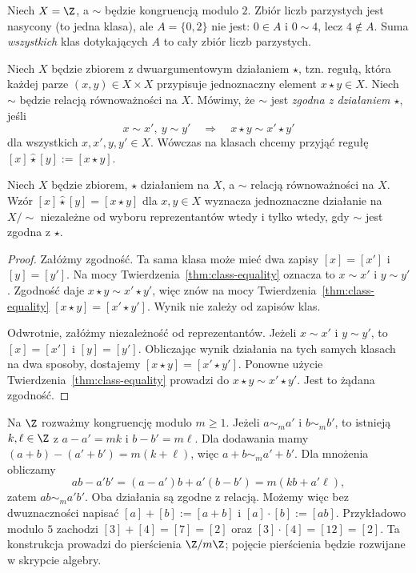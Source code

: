 \begin{przyklad}
Niech $X=\Z$, a $\sim$ będzie kongruencją modulo $2$.
Zbiór liczb parzystych jest nasycony (to jedna klasa),
ale $A=\{0,2\}$ nie jest: $0\in A$ i $0\sim 4$,
lecz $4\notin A$. Suma \emph{wszystkich} klas dotykających
$A$ to cały zbiór liczb parzystych.
\end{przyklad}

\begin{definicja}
Niech $X$ będzie zbiorem z dwuargumentowym działaniem
$\star$, tzn. regułą, która każdej parze $(x,y)\in X\times X$
przypisuje jednoznaczny element $x\star y\in X$.
Niech $\sim$ będzie relacją równoważności na $X$.
Mówimy, że $\sim$ jest \emph{zgodna z działaniem $\star$}, jeśli
\[
 x\sim x',\ y\sim y'\quad\Longrightarrow\quad
 x\star y\sim x'\star y'
\]
dla wszystkich $x,x',y,y'\in X$.
Wówczas na klasach chcemy przyjąć regułę
$[x]\widehat\star[y]:=[x\star y]$.
\end{definicja}

\begin{twierdzenie}
\label{thm:eq-operation}
Niech $X$ będzie zbiorem, $\star$ działaniem na $X$,
a $\sim$ relacją równoważności na $X$. Wzór
$[x]\widehat\star[y]=[x\star y]$ dla $x,y\in X$
wyznacza jednoznaczne działanie na $X/{\sim}$ niezależne
od wyboru reprezentantów wtedy i tylko wtedy, gdy $\sim$ jest
zgodna z $\star$.
\end{twierdzenie}
\begin{proof}
Załóżmy zgodność. Ta sama klasa może mieć dwa zapisy
$[x]=[x']$ i $[y]=[y']$. Na mocy
Twierdzenia~\ref{thm:class-equality} oznacza to
$x\sim x'$ i $y\sim y'$. Zgodność daje
$x\star y\sim x'\star y'$, więc znów na mocy
Twierdzenia~\ref{thm:class-equality}
$[x\star y]=[x'\star y']$. Wynik nie zależy od zapisów klas.

Odwrotnie, załóżmy niezależność od reprezentantów.
Jeżeli $x\sim x'$ i $y\sim y'$, to $[x]=[x']$ i
$[y]=[y']$. Obliczając wynik działania na tych samych
klasach na dwa sposoby, dostajemy
$[x\star y]=[x'\star y']$. Ponowne użycie
Twierdzenia~\ref{thm:class-equality} prowadzi do
$x\star y\sim x'\star y'$. Jest to żądana zgodność.
\end{proof}

\begin{przyklad}\label{ex:eq-mod-arithmetic}
Na $\Z$ rozważmy kongruencję modulo $m\ge1$.
Jeżeli $a\sim_m a'$ i $b\sim_m b'$, to istnieją
$k,\ell\in\Z$ z $a-a'=mk$ i $b-b'=m\ell$.
Dla dodawania mamy
$(a+b)-(a'+b')=m(k+\ell)$, więc
$a+b\sim_m a'+b'$.
Dla mnożenia obliczamy
\[
 ab-a'b'=(a-a')b+a'(b-b')=m(kb+a'\ell),
\]
zatem $ab\sim_m a'b'$. Oba działania są zgodne z relacją.
Możemy więc bez dwuznaczności napisać
$[a]+[b]:=[a+b]$ i $[a]\cdot[b]:=[ab]$.
Przykładowo modulo $5$ zachodzi
$[3]+[4]=[7]=[2]$ oraz $[3]\cdot[4]=[12]=[2]$.
Ta konstrukcja prowadzi do pierścienia $\Z/m\Z$;
pojęcie pierścienia będzie rozwijane w skrypcie algebry.
\end{przyklad}

